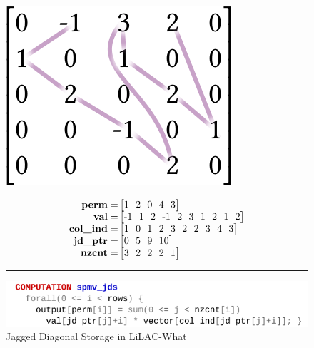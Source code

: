 \begin{figure}[t]
\begin{minipage}[b]{0.3\linewidth}
\includegraphics[width=0.9\linewidth]{figures/jdsorder.png}
\vspace{0.04em}
\end{minipage}
\begin{minipage}[b]{0.65\linewidth}
\footnotesize
\begin{align*}
\text{\bf perm} =& \begin{bmatrix}1\ \ 2\ \ 0\ \ 4\ \ 3\\\end{bmatrix}\\[-0.4em]
\text{\bf val} =& \begin{bmatrix}\text{-}1\ \ 1\ \ 2\ \ \text{-}1\ \ 2\ \ 3\ \ 1\ \ 2\ \ 1\ \ 2\\\end{bmatrix}\\[-0.4em]
\text{\bf col\_ind} =& \begin{bmatrix}1\ \ 0\ \ 1\ \ 2\ \ 3\ \ 2\ \ 2\ \ 3\ \ 4\ \ 3\\\end{bmatrix}\\[-0.4em]
\text{\bf jd\_ptr} =& \begin{bmatrix}0\ \ 5\ \ 9\ \ 10\\\end{bmatrix}\\[-0.4em]
\text{\bf nzcnt} =& \begin{bmatrix}3\ \ 2\ \ 2\ \ 2\ \ 1\end{bmatrix}
\end{align*}
\end{minipage}
\vspace{0.5em}
\hrule
\vspace{0.3em}
\includegraphics[width=\linewidth]{figures/spmvjdswhat.pdf}
\vspace{-1.2em}
\caption{Jagged Diagonal Storage in LiLAC-What}
\label{jds_lilacwhat_fig}
\end{figure}

